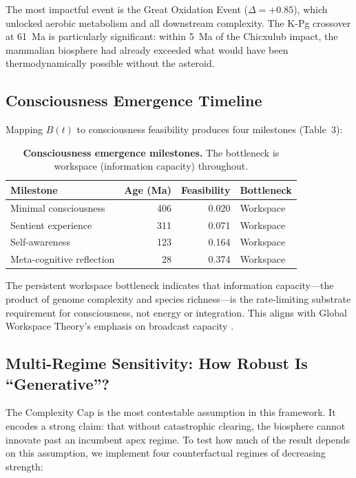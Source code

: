 \documentclass[10pt,letterpaper]{article}
\newcommand{\bt}{$B(t)$}
\begin{document}
The most impactful event is the Great Oxidation Event ($\Delta = +0.85$), which
unlocked aerobic metabolism and all downstream complexity. The K-Pg crossover at
61~Ma is particularly significant: within 5~Ma of the Chicxulub impact, the
mammalian biosphere had already exceeded what would have been thermodynamically
possible without the asteroid.

\subsection*{Consciousness Emergence Timeline}

Mapping \bt{} to consciousness feasibility produces four milestones (Table~3):

\begin{table}[H]
\caption{{\bf Consciousness emergence milestones.}
The bottleneck is workspace (information capacity) throughout.}
\begin{tabular}{lrrl}
\toprule
Milestone & Age (Ma) & Feasibility & Bottleneck \\
\midrule
Minimal consciousness & 406 & 0.020 & Workspace \\
Sentient experience & 311 & 0.071 & Workspace \\
Self-awareness & 123 & 0.164 & Workspace \\
Meta-cognitive reflection & 28 & 0.374 & Workspace \\
\bottomrule
\end{tabular}
\end{table}

The persistent workspace bottleneck indicates that information capacity---the
product of genome complexity and species richness---is the rate-limiting
substrate requirement for consciousness, not energy or integration. This aligns
with Global Workspace Theory's emphasis on broadcast capacity \cite{baars1988}.

\subsection*{Multi-Regime Sensitivity: How Robust Is ``Generative''?}

The Complexity Cap is the most contestable assumption in this framework.
It encodes a strong claim: that without catastrophic clearing, the biosphere
cannot innovate past an incumbent apex regime. To test how much of the result
depends on this assumption, we implement four counterfactual regimes of
decreasing strength:
\end{document}

